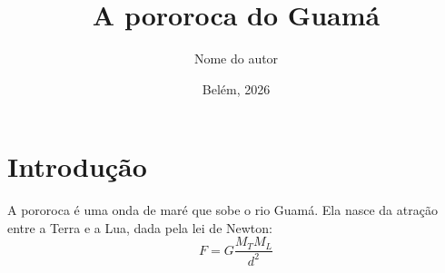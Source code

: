 \documentclass{article}
\title{A pororoca do Guamá}
\author{Nome do autor}
\date{Belém, 2026}
\begin{document}
\maketitle
\section{Introdução}
A pororoca é uma onda de maré que sobe o rio Guamá.
Ela nasce da atração entre a Terra e a Lua,
dada pela lei de Newton:
\begin{equation}
  F = G \frac{M_T M_L}{d^2}
\end{equation}
\end{document}

